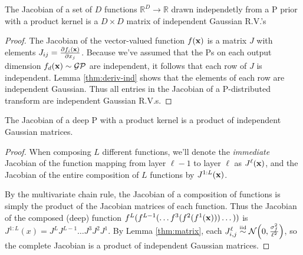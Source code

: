 \documentclass[twoside]{article}
\makeatletter
\newcommand{\fdeep}{f^{1:L}}
\newcommand{\Jx}{J_{\vx \rightarrow \vy}}
\newcommand{\Jxx}{J_{\vx \rightarrow \vy}(\vx)}
\newcommand{\Jy}{J_{\vy \rightarrow \vx}}
\newlength{\nonHumbleHeight}
\def\@humbleformat#1{{\settoheight{\nonHumbleHeight}{#1}\resizebox{!}{0.94\nonHumbleHeight}{#1}}}%
\def\humble#1{\@humbleformat{#1}}%
\newcommand{\gp}{{\humble GP}}
\makeatother
\begin{document}
\begin{lemma}
\label{thm:matrix}
The Jacobian of a set of $D$ functions $\mathbb{R}^D \rightarrow \mathbb{R}$ drawn independetly from a \gp{} prior with a product kernel is a $D \times D$ matrix of independent Gaussian R.V.'s
\end{lemma}
%
\begin{proof}
The Jacobian of the vector-valued function $f({\bf{x}})$ is a matrix $J$ with elements ${J_{ij} = \frac{ \partial f_i ({\bf{x}}) }{\partial x_j}}$.
%
%
%
Because we've assumed that the \gp{}s on each output dimension $f_d({\bf{x}}) \sim \mathcal{GP}$ are independent, it follows that each row of $J$ is independent.
Lemma \ref{thm:deriv-ind} shows that the elements of each row are independent Gaussian.
Thus all entries in the Jacobian of a \gp{}-distributed transform are independent Gaussian R.V.s.
\end{proof}


\begin{theorem}
\label{thm:prodjacob}
The Jacobian of a deep \gp{} with a product kernel is a product of independent Gaussian matrices.
\end{theorem}
%
\begin{proof}
When composing $L$ different functions, we'll denote the \emph{immediate} Jacobian of the function mapping from layer $\ell -1$ to layer $\ell$ as $J^\ell({\bf{x}})$, and the Jacobian of the entire composition of $L$ functions by $J^{1:L}({\bf{x}})$.

By the multivariate chain rule, the Jacobian of a composition of functions is simply the product of the Jacobian matrices of each function.  
%
Thus the Jacobian of the composed (deep) function $f^L(f^{L-1}(\dots f^3(f^2(f^1({\bf{x}})))\dots))$ is
%
$ J^{1:L}(x) 
= J^L J^{L-1} \dots J^3 J^2 J^1$. 
By Lemma \ref{thm:matrix}, each ${J^\ell_{i,j} \simiid \Nt{0}{\frac{\sigma^2_f}{\ell^2}}}$, so the complete Jacobian is a product of independent Gaussian matrices.
\end{proof}
\end{document}
